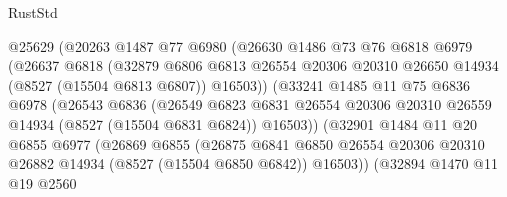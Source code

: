 \begin{lexlean}{RustStd}
\begin{coremodule}
                          @25629
                          (@20263
                            @1487
                            @77
                            @6980
                            (@26630
                              @1486
                              @73
                              @76
                              @6818
                              @6979
                              (@26637
                                @6818
                                (@32879
                                  @6806
                                  @6813
                                  @26554
                                  @20306
                                  @20310
                                  @26650
                                  @14934
                                  (@8527 (@15504 @6813 @6807))
                                  @16503))
                              (@33241
                                @1485
                                @11
                                @75
                                @6836
                                @6978
                                (@26543
                                  @6836
                                  (@26549
                                    @6823
                                    @6831
                                    @26554
                                    @20306
                                    @20310
                                    @26559
                                    @14934
                                    (@8527 (@15504 @6831 @6824))
                                    @16503))
                                (@32901
                                  @1484
                                  @11
                                  @20
                                  @6855
                                  @6977
                                  (@26869
                                    @6855
                                    (@26875
                                      @6841
                                      @6850
                                      @26554
                                      @20306
                                      @20310
                                      @26882
                                      @14934
                                      (@8527 (@15504 @6850 @6842))
                                      @16503))
                                  (@32894
                                    @1470
                                    @11
                                    @19
                                    @2560

\end{coremodule}
\end{lexlean}
